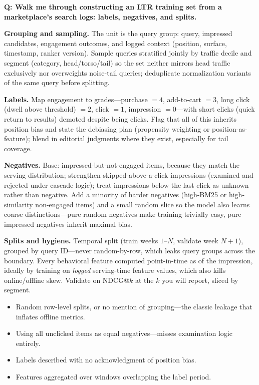 \begin{interviewq}
\textbf{Q: Walk me through constructing an LTR training set from a marketplace's search logs: labels, negatives, and splits.}

 \quad {} \quad \badgefreq{\freqmed}

\stronganswer

\textbf{Grouping and sampling.} The unit is the query group: query, impressed candidates, engagement outcomes, and logged context (position, surface, timestamp, ranker version). Sample queries stratified jointly by traffic decile and segment (category, head/torso/tail) so the set neither mirrors head traffic exclusively nor overweights noise-tail queries; deduplicate normalization variants of the same query before splitting.

\textbf{Labels.} Map engagement to grades---purchase $=4$, add-to-cart $=3$, long click (dwell above threshold) $=2$, click $=1$, impression $=0$---with short clicks (quick return to results) demoted despite being clicks. Flag that all of this inherits position bias and state the debiasing plan (propensity weighting or position-as-feature); blend in editorial judgments where they exist, especially for tail coverage.

\textbf{Negatives.} Base: impressed-but-not-engaged items, because they match the serving distribution; strengthen skipped-above-a-click impressions (examined and rejected under cascade logic); treat impressions below the last click as unknown rather than negative. Add a minority of harder negatives (high-BM25 or high-similarity non-engaged items) and a small random slice so the model also learns coarse distinctions---pure random negatives make training trivially easy, pure impressed negatives inherit maximal bias.

\textbf{Splits and hygiene.} Temporal split (train weeks $1$--$N$, validate week $N{+}1$), grouped by query ID---never random-by-row, which leaks query groups across the boundary. Every behavioral feature computed point-in-time as of the impression, ideally by training on \textit{logged} serving-time feature values, which also kills online/offline skew. Validate on NDCG@$k$ at the $k$ you will report, sliced by segment.

\redflags
\begin{itemize}
    \item Random row-level splits, or no mention of grouping---the classic leakage that inflates offline metrics.
    \item Using all unclicked items as equal negatives---misses examination logic entirely.
    \item Labels described with no acknowledgment of position bias.
    \item Features aggregated over windows overlapping the label period.
\end{itemize}


\end{interviewq}
